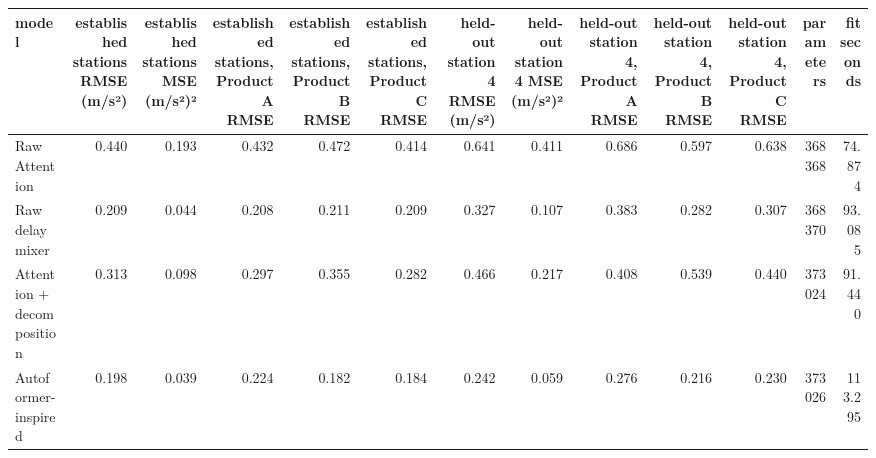 \begin{tabular}{lrrrrrrrrrrrr}
\toprule
model & established stations RMSE (m/s²) & established stations MSE (m/s²)² & established stations, Product A RMSE & established stations, Product B RMSE & established stations, Product C RMSE & held-out station 4 RMSE (m/s²) & held-out station 4 MSE (m/s²)² & held-out station 4, Product A RMSE & held-out station 4, Product B RMSE & held-out station 4, Product C RMSE & parameters & fit seconds \\
\midrule
Raw Attention & 0.440 & 0.193 & 0.432 & 0.472 & 0.414 & 0.641 & 0.411 & 0.686 & 0.597 & 0.638 & 368368 & 74.874 \\
Raw delay mixer & 0.209 & 0.044 & 0.208 & 0.211 & 0.209 & 0.327 & 0.107 & 0.383 & 0.282 & 0.307 & 368370 & 93.085 \\
Attention + decomposition & 0.313 & 0.098 & 0.297 & 0.355 & 0.282 & 0.466 & 0.217 & 0.408 & 0.539 & 0.440 & 373024 & 91.440 \\
Autoformer-inspired & 0.198 & 0.039 & 0.224 & 0.182 & 0.184 & 0.242 & 0.059 & 0.276 & 0.216 & 0.230 & 373026 & 113.295 \\
\bottomrule
\end{tabular}
